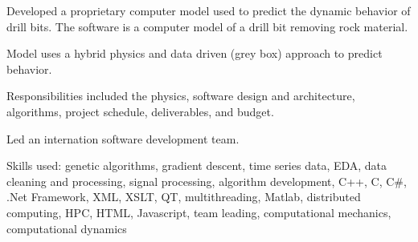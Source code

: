 \documentclass{leresume}
\begin{document}
		\begin{bulletedlist}
			
		\item
		
					Developed a proprietary computer model used to predict the dynamic behavior of drill bits.  The software is a computer model of a drill bit removing rock material.
					
		\begin{bulletedlist}
			
		\item
		
							Model uses a hybrid physics and data driven (grey box) approach to predict behavior.
						
		\item
		
							Responsibilities included the physics, software design and architecture, algorithms, project schedule, deliverables, and budget.
						
		\item
		
							Led an internation software development team.
						
		\item
		
							Skills used: genetic algorithms, gradient descent, time series data, EDA, data cleaning and processing, signal processing, algorithm development, C++, C, C\#, .Net Framework, XML, XSLT, QT, multithreading, Matlab, distributed computing, HPC, HTML, Javascript, team leading, computational mechanics, computational dynamics
						
		\end{bulletedlist}
	
		\end{bulletedlist}
	
		
		
		
		
\end{document}

